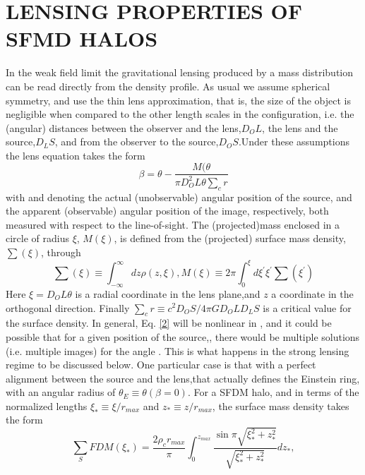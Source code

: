 \documentclass[15pt]{IEEEtran}
\begin{document}
\section{\textbf{LENSING PROPERTIES OF SFMD HALOS}}

In  the  weak  field  limit  the  gravitational  lensing  produced by a mass distribution can be read directly from the density profile.  As usual we assume spherical symmetry, and use the thin lens approximation, that is, the size of  the  object  is  negligible  when  compared  to  the  other length scales in the configuration, i.e.  the (angular) distances between the observer and the lens,\(D_OL\), the lens and the source,\(D_LS\), and from the observer to the source,\(D_OS\).Under these assumptions the lens equation takes the form
\begin{equation} \tag{2}\label{2}
    \beta = \theta -  \frac{M(\theta}{\pi D^2_OL\theta\sum_cr}
\end{equation}
with \textbeta and \texttheta denoting the actual (unobservable) angular position of the source, and the apparent (observable) angular position of the image, respectively, both measured with  respect  to  the  line-of-sight. The  (projected)mass  enclosed  in  a  circle  of  radius \(\xi\), \(M(\xi)\),  is  defined from the (projected) surface mass density, \(\sum(\xi)\), through
\begin{equation}\tag{3}\label{3}
    \sum(\xi) \equiv \int_{-\infty}^{\infty} dz \rho(z,\xi),  M(\xi) \equiv 2\pi \int_{0}^{\xi} d\xi^{'}\xi^{'}\sum(\xi^{'})
\end{equation}
Here \(\xi= D_OL\theta\) is a radial coordinate in the lens plane,and \(z\) a coordinate in the orthogonal direction.  Finally \(\sum_cr \equiv c^2D_OS/4\pi GD_OLD_LS\) is a critical value for the surface density. In general, Eq. \eqref{2} will be nonlinear in \texttheta, and it could be possible that for a given position of the source,\textbeta, there would  be  multiple  solutions  (i.e.   multiple  images)  for the angle \texttheta.  This is what happens in the strong lensing regime to be discussed below.  One particular case is that with a perfect alignment between the source and the lens,that actually defines the Einstein ring, with an angular radius of \(\theta_E \equiv \theta(\beta = 0)\). For  a  SFDM  halo,  and  in  terms  of  the  normalized lengths \(\xi_* \equiv \xi/r_{max}\) and \(z_* \equiv z/r_{max}\), the surface mass density takes the form
\begin{equation}\tag{4}\label{4}
    \sum_SFDM(\xi_*) = \frac{2\rho_c r_{max}}{\pi} \int_{0}^{z_{max}} \frac{\sin{\pi\sqrt{\xi^2_*+z^2_*}}}{\sqrt{\xi^2_*+z^2_*}} dz_*,
\end{equation}
\end{document}
